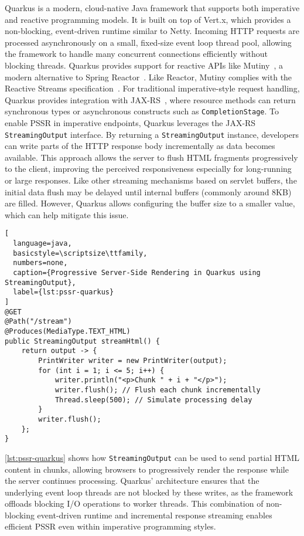 Quarkus is a modern, cloud-native Java framework that supports both imperative
and reactive programming models. It is built on top of Vert.x, which provides a
non-blocking, event-driven runtime similar to Netty. Incoming HTTP requests are
processed asynchronously on a small, fixed-size event loop thread pool,
allowing the framework to handle many concurrent connections efficiently
without blocking threads. Quarkus provides support for reactive APIs like
Mutiny~\cite{mutiny2021}, a modern alternative to Spring
Reactor~\cite{projectreactor}. Like Reactor, Mutiny complies with the Reactive
Streams specification~\cite{ReactiveStreams}. For traditional imperative-style
request handling, Quarkus provides integration with
JAX-RS~\cite{burke2013restful}, where resource methods can return synchronous
types or asynchronous constructs such as \texttt{CompletionStage}. To enable
PSSR in imperative endpoints, Quarkus leverages the JAX-RS
\texttt{StreamingOutput} interface. By returning a \texttt{StreamingOutput}
instance, developers can write parts of the HTTP response body incrementally as
data becomes available. This approach allows the server to flush HTML fragments
progressively to the client, improving the perceived responsiveness especially
for long-running or large responses. Like other streaming mechanisms
based on servlet buffers, the initial data flush may be delayed until internal
buffers (commonly around 8KB) are filled. However, Quarkus allows configuring
the buffer size to a smaller value, which can help mitigate this issue.

\begin{lstlisting}[
  language=java,
  basicstyle=\scriptsize\ttfamily,
  numbers=none,
  caption={Progressive Server-Side Rendering in Quarkus using StreamingOutput},
  label={lst:pssr-quarkus}
]
@GET
@Path("/stream")
@Produces(MediaType.TEXT_HTML)
public StreamingOutput streamHtml() {
    return output -> {
        PrintWriter writer = new PrintWriter(output);
        for (int i = 1; i <= 5; i++) {
            writer.println("<p>Chunk " + i + "</p>");
            writer.flush(); // Flush each chunk incrementally
            Thread.sleep(500); // Simulate processing delay
        }
        writer.flush();
    };
}
\end{lstlisting}

\autoref{lst:pssr-quarkus} shows how \texttt{StreamingOutput} can be used to send
partial HTML content in chunks, allowing browsers to progressively render the
response while the server continues processing. Quarkus’ architecture ensures
that the underlying event loop threads are not blocked by these writes, as the
framework offloads blocking I/O operations to worker threads. This combination
of non-blocking event-driven runtime and incremental response streaming enables
efficient PSSR even within imperative programming styles.